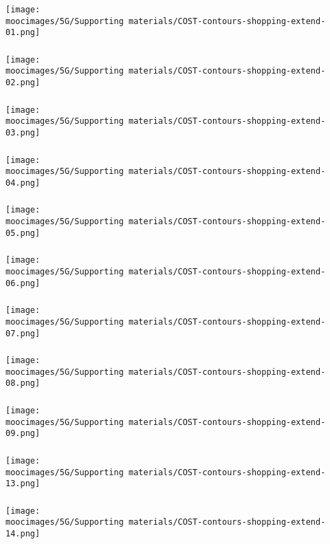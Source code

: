 \documentclass[handout,11pt,aspectratio=169,mathserif]{beamer}
\begin{document}
\begin{frame}\frametitle{}
	\centerline{\texttt{[image: \\moocimages/5G/Supporting materials/COST-contours-shopping-extend-01.png]}}
\end{frame}
\begin{frame}\frametitle{}
	\centerline{\texttt{[image: \\moocimages/5G/Supporting materials/COST-contours-shopping-extend-02.png]}}
\end{frame}
\begin{frame}\frametitle{}
	\centerline{\texttt{[image: \\moocimages/5G/Supporting materials/COST-contours-shopping-extend-03.png]}}
\end{frame}
\begin{frame}\frametitle{}
	\centerline{\texttt{[image: \\moocimages/5G/Supporting materials/COST-contours-shopping-extend-04.png]}}
\end{frame}
\begin{frame}\frametitle{}
	\centerline{\texttt{[image: \\moocimages/5G/Supporting materials/COST-contours-shopping-extend-05.png]}}
\end{frame} 
\begin{frame}\frametitle{}
	\centerline{\texttt{[image: \\moocimages/5G/Supporting materials/COST-contours-shopping-extend-06.png]}}
\end{frame}
\begin{frame}\frametitle{}
	\centerline{\texttt{[image: \\moocimages/5G/Supporting materials/COST-contours-shopping-extend-07.png]}}
\end{frame}
\begin{frame}\frametitle{}
	\centerline{\texttt{[image: \\moocimages/5G/Supporting materials/COST-contours-shopping-extend-08.png]}}
\end{frame}
\begin{frame}\frametitle{}
	\centerline{\texttt{[image: \\moocimages/5G/Supporting materials/COST-contours-shopping-extend-09.png]}}
\end{frame}
\begin{frame}\frametitle{}
	\centerline{\texttt{[image: \\moocimages/5G/Supporting materials/COST-contours-shopping-extend-13.png]}}
\end{frame}
\begin{frame}\frametitle{}
	\centerline{\texttt{[image: \\moocimages/5G/Supporting materials/COST-contours-shopping-extend-14.png]}}
\end{frame}
\end{document}
